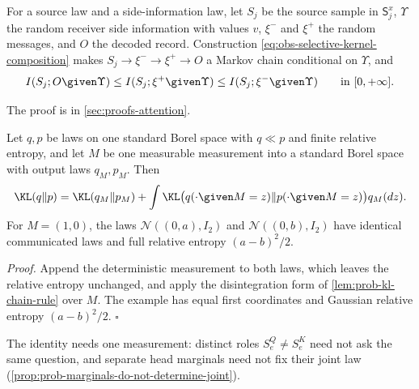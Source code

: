 For a source law and a side-information law, let \(S_j\) be the source sample
in \(\mathsf S_j^x\), \(\Upsilon\) the random receiver side information with
values \(v\), \(\xi^-\) and \(\xi^+\) the random messages, and \(O\) the decoded
record. Construction \eqref{eq:obs-selective-kernel-composition} makes
\(S_j\to\xi^-\to\xi^+\to O\) a Markov chain conditional on \(\Upsilon\), and
\begin{equation}
I(S_j;O\given\Upsilon)\leq I(S_j;\xi^+\given\Upsilon)\leq I(S_j;\xi^-\given\Upsilon)
\qquad\text{in }[0,+\infty].
\label{eq:obs-selective-information-chain}
\end{equation}

The proof is in \cref{sec:proofs-attention}.

Let \(q,p\) be laws on one standard Borel space with \(q\ll p\) and finite
relative entropy, and let \(M\) be one measurable measurement into a standard
Borel space with output laws \(q_M,p_M\). Then
\begin{equation}
\KL(q\Vert p)=\KL(q_M\Vert p_M)+
\int\KL\bigl(q(\cdot\given M=z)\Vert p(\cdot\given M=z)\bigr)q_M(dz).
\label{eq:obs-selective-private-kl}
\end{equation}
For \(M=(1,0)\), the laws \(\mathcal N((0,a),I_2)\) and \(\mathcal N((0,b),I_2)\)
have identical communicated laws and full relative entropy \((a-b)^2/2\).

\noindent\emph{Proof.}
Append the deterministic measurement to both laws, which leaves the relative
entropy unchanged, and apply the disintegration form of
\cref{lem:prob-kl-chain-rule} over \(M\). The example has equal first
coordinates and Gaussian relative entropy \((a-b)^2/2\). \(\square\)

The identity needs one measurement: distinct roles \(S^Q_e\ne S^K_e\) need not
ask the same question, and separate head marginals need not fix their joint
law (\cref{prop:prob-marginals-do-not-determine-joint}).


